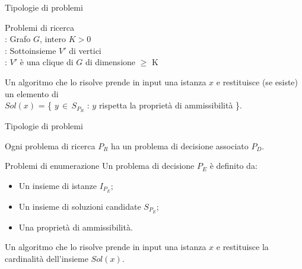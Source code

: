 \documentclass[10pt,a4paper]{article}
\begin{document}
\begin{multicols}{3}
\begin{textbox}{Tipologie di problemi}
\begin{textbox}{Problemi di ricerca}
\\
: Grafo \(G\), intero \(K > 0\) \\
: Sottoinsieme \(V'\) di vertici \\
: \(V'\) è una clique di \(G\) di dimensione \(\geq\) K

Un algoritmo che lo risolve prende in input una
istanza \(x\) e restituisce (se esiste) un elemento di\\
\(Sol(x)\) = \{ \(y\,\in\,S_{P_R}\) : \(y\) rispetta la proprietà di ammissibilità \}.

\end{textbox}

\end{textbox}

\begin{textbox}{Tipologie di problemi}

Ogni problema di ricerca \(P_R\) ha un problema di decisione associato \(P_D\).\\

\begin{textbox}{Problemi di enumerazione}
Un problema di decisione \(P_E\) è definito da:
\begin{itemize}[leftmargin=*]
    \item Un insieme di istanze \(I_{P_E}\);
    \item Un insieme di soluzioni candidate  \(S_{P_E}\);
    \item Una proprietà di ammissibilità.
\end{itemize}
Un algoritmo che lo risolve prende in input una istanza \(x\)  e
restituisce la cardinalità dell’insieme \(Sol(x)\).
\end{textbox}


\end{textbox}
\end{multicols}
\end{document}
